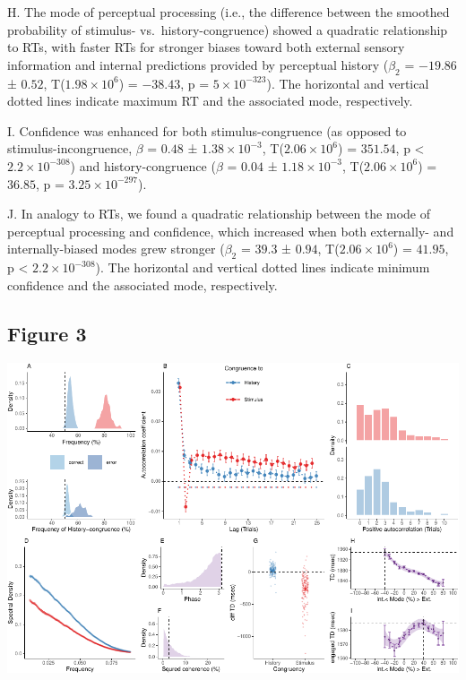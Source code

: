 \documentclass[
]{article}
\begin{document}
H. The mode of perceptual processing (i.e., the difference between the
smoothed probability of stimulus- vs.~history-congruence) showed a
quadratic relationship to RTs, with faster RTs for stronger biases
toward both external sensory information and internal predictions
provided by perceptual history (\(\beta_2\) = \(-19.86\) ± \(0.52\),
T(\(\ensuremath{1.98\times 10^{6}}\)) = \(-38.43\), p =
\(\ensuremath{5\times 10^{-323}}\)). The horizontal and vertical dotted
lines indicate maximum RT and the associated mode, respectively.

I. Confidence was enhanced for both stimulus-congruence (as opposed to
stimulus-incongruence, \(\beta\) = \(0.48\) ±
\(\ensuremath{1.38\times 10^{-3}}\),
T(\(\ensuremath{2.06\times 10^{6}}\)) = \(351.54\), p < \(\ensuremath{2.2\times 10^{-308}}\)) and
history-congruence (\(\beta\) = \(0.04\) ±
\(\ensuremath{1.18\times 10^{-3}}\),
T(\(\ensuremath{2.06\times 10^{6}}\)) = \(36.85\), p =
\(\ensuremath{3.25\times 10^{-297}}\)).

J. In analogy to RTs, we found a quadratic relationship between the mode
of perceptual processing and confidence, which increased when both
externally- and internally-biased modes grew stronger (\(\beta_2\) =
\(39.3\) ± \(0.94\), T(\(\ensuremath{2.06\times 10^{6}}\)) = \(41.95\),
p < \(\ensuremath{2.2\times 10^{-308}}\)). The horizontal and vertical dotted lines indicate minimum
confidence and the associated mode, respectively.

\hypertarget{figure-3}{%
\subsection{Figure 3}\label{figure-3}}

\includegraphics{modes_mouse_rev1b_files/figure-latex/Figure_3-1.pdf}
\end{document}

